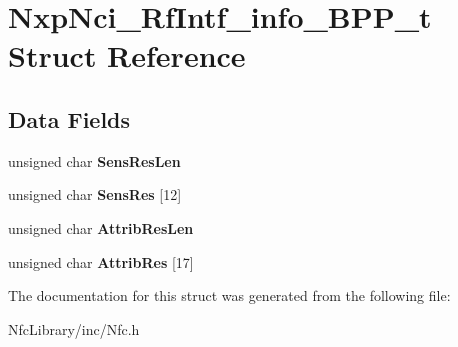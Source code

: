 \hypertarget{struct_nxp_nci___rf_intf__info___b_p_p__t}{}\section{Nxp\+Nci\+\_\+\+Rf\+Intf\+\_\+info\+\_\+\+B\+P\+P\+\_\+t Struct Reference}
\label{struct_nxp_nci___rf_intf__info___b_p_p__t}
\subsection*{Data Fields}
\begin{DoxyCompactItemize}
\item 
\mbox{\label{struct_nxp_nci___rf_intf__info___b_p_p__t_a8e7877c8e05ffe49561c3844ece0057a}} 
unsigned char {\bfseries Sens\+Res\+Len}
\item 
\mbox{\label{struct_nxp_nci___rf_intf__info___b_p_p__t_a98b7748ada2da4067e5d6a62872833eb}} 
unsigned char {\bfseries Sens\+Res} \mbox{[}12\mbox{]}
\item 
\mbox{\label{struct_nxp_nci___rf_intf__info___b_p_p__t_af7d59d65ee7e9284eaea162062e798aa}} 
unsigned char {\bfseries Attrib\+Res\+Len}
\item 
\mbox{\label{struct_nxp_nci___rf_intf__info___b_p_p__t_a48418af14000e8fadb58e9f76bd711a9}} 
unsigned char {\bfseries Attrib\+Res} \mbox{[}17\mbox{]}
\end{DoxyCompactItemize}


The documentation for this struct was generated from the following file\+:\begin{DoxyCompactItemize}
\item 
Nfc\+Library/inc/Nfc.\+h\end{DoxyCompactItemize}
